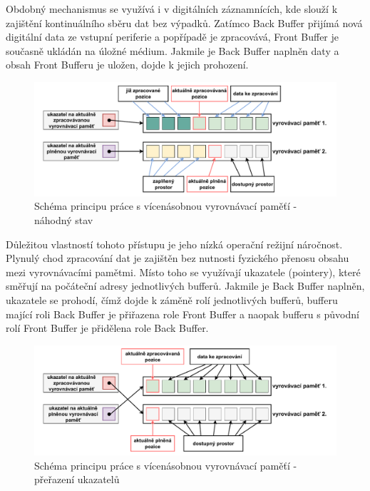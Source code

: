 Obdobný mechanismus se využívá i v digitálních záznamnících, kde slouží k zajištění kontinuálního sběru dat bez výpadků. Zatímco Back Buffer přijímá nová digitální data ze vstupní periferie a popřípadě je zpracovává, Front Buffer je současně ukládán na úložné médium. Jakmile je Back Buffer naplněn daty a obsah Front Bufferu je uložen, dojde k jejich prohození.

\begin{figure}[h]
    \centering
    \includegraphics[width=1.00\textwidth]{obrazky-figures/multiple_buffering-1.pdf}
    
    \caption{Schéma principu práce s vícenásobnou vyrovnávací paměťí - náhodný stav}
    \label{fig:multiple-buffering-1}
\end{figure}

Důležitou vlastností tohoto přístupu je jeho nízká operační režijní náročnost. Plynulý chod zpracování dat je zajištěn bez nutnosti fyzického přenosu obsahu mezi vyrovnávacími pamětmi. Místo toho se využívají ukazatele (pointery), které směřují na počáteční adresy jednotlivých bufferů. Jakmile je Back Buffer naplněn, ukazatele se prohodí, čímž dojde k záměně rolí jednotlivých bufferů, bufferu mající roli Back Buffer je přiřazena role Front Buffer a naopak bufferu s původní rolí Front Buffer je přidělena role Back Buffer.

\begin{figure}[h]
    \centering
    \includegraphics[width=1.00\textwidth]{obrazky-figures/multiple_buffering-2.pdf}
    
    \caption{Schéma principu práce s vícenásobnou vyrovnávací paměťí - přeřazení ukazatelů}
    \label{fig:multiple-buffering-2}
\end{figure}


